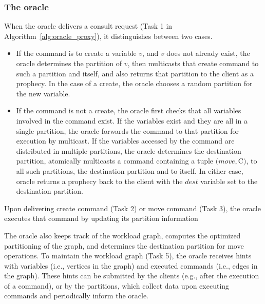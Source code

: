 \subsubsection{The oracle} 

When the oracle delivers a consult request (Task 1 in Algorithm~\ref{alg:oracle_proxy}), it distinguishes between two cases.
\begin{itemize}
\item If the command is to create a variable $v$, and $v$ does not already exist, the oracle determines the partition of $v$, then multicasts that create command to such a partition and itself, and also returns that partition to the client as a prophecy.
In the case of a create, the oracle chooses a random partition for the new variable.
\item If the command is not a create, the oracle first checks that all variables involved in the command exist.
If the variables exist and they are all in a single partition, the oracle forwards the command to that partition for execution by multicast.
If the variables accessed by the command are distributed in multiple partitions, the oracle determines the destination partition, atomically multicasts a command containing a tuple $(move, $C$)$, to all such partitions, the destination partition and to itself.
In either case, oracle returns a prophecy back to the client with the $dest$ variable set to the destination partition.
\end{itemize}

Upon delivering create command (Task 2) or move command (Task 3), the oracle executes that command by updating its partition information

The oracle also keeps track of the workload graph, computes the optimized partitioning of the graph, and determines the destination partition for move operations. %
To maintain the workload graph (Task 5), the oracle receives hints with variables (i.e., vertices in the graph) and executed commands (i.e., edges in the graph).
These hints can be submitted by the clients (e.g., after the execution of a command), or by the partitions, which collect data upon executing commands and periodically inform the oracle.

